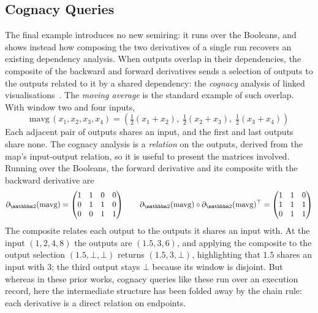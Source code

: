 \subsection{Cognacy Queries}
\label{sec:examples:linked}

The final example introduces no new semiring: it runs over the Booleans, and shows instead how
composing the two derivatives of a single run recovers an existing dependency analysis. When outputs overlap
in their dependencies, the composite of the backward and forward derivatives sends a selection of outputs to
the outputs related to it by a shared dependency: the \emph{cognacy} analysis of linked
visualisations~\cite{perera22,bond25,psallidas18}. The \emph{moving average} is the standard example of such
overlap. With window two and four inputs,
\begin{displaymath}
  \mathrm{mavg}\,(x_1, x_2, x_3, x_4) =
  (\tfrac{1}{2} (x_1 + x_2),\; \tfrac{1}{2} (x_2 + x_3),\; \tfrac{1}{2} (x_3 + x_4))
\end{displaymath}
\noindent Each adjacent pair of outputs shares an input, and the
first and last outputs share none. The cognacy analysis is a \emph{relation} on the outputs, derived from the
map's input-output relation, so it is useful to present the matrices involved. Running over the Booleans, the
forward derivative and its composite with the backward derivative are
\begin{displaymath}
  \partial_{\Two}(\mathrm{mavg}) =
  \begin{pmatrix} 1 & 1 & 0 & 0 \\ 0 & 1 & 1 & 0 \\ 0 & 0 & 1 & 1 \end{pmatrix}
  \qquad
  \partial_{\Two}(\mathrm{mavg}) \comp \transpose{\partial_{\Two}(\mathrm{mavg})} =
  \begin{pmatrix} 1 & 1 & 0 \\ 1 & 1 & 1 \\ 0 & 1 & 1 \end{pmatrix}
\end{displaymath}
The composite relates each output to the outputs it shares an input with. At the input $(1, 2, 4, 8)$
the outputs are $(1.5, 3, 6)$, and applying the composite to the output selection $(1.5, \bot, \bot)$ returns
$(1.5, 3, \bot)$, highlighting that $1.5$ shares an input with $3$; the third output stays $\bot$ because its
window is disjoint. But whereas in these prior works, cognacy queries like these run over an execution record,
here the intermediate structure has been folded away by the chain rule: each derivative is a direct relation
on endpoints.
